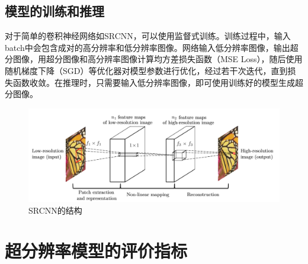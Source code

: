 \subsection{模型的训练和推理}
对于简单的卷积神经网络如SRCNN，可以使用监督式训练。训练过程中，输入batch中会包含成对的高分辨率和低分辨率图像。网络输入低分辨率图像，输出超分图像，用超分图像和高分辨率图像计算均方差损失函数（MSE Loss），随后使用随机梯度下降（SGD）等优化器对模型参数进行优化，经过若干次迭代，直到损失函数收敛。在推理时，只需要输入低分辨率图像，即可使用训练好的模型生成超分图像。

\begin{figure}[h]
    \centering
    \includegraphics[width=1.0\textwidth]{imgs/SRCNN.png}
    \caption{SRCNN的结构}
    \label{fig:SRCNN}
\end{figure}


\section{超分辨率模型的评价指标}